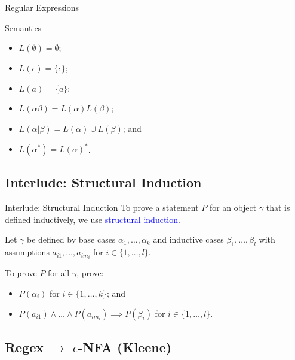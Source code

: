 \documentclass{beamer}
\def\padding{\vspace{0.5cm}}
\def\b{\textcolor{blue}}
\begin{document}
\begin{frame}{Regular Expressions}
    \begin{block}{Semantics}
        \begin{itemize}
            \item $L(\boldsymbol{\emptyset}) = \emptyset$\pause;
            \item $L(\epsilon) = \{\epsilon\}$\pause;
            \item $L(a) = \{a\}$\pause;
            \item $L(\alpha \beta) = L(\alpha) L(\beta)$\pause;
            \item $L(\alpha | \beta) = L(\alpha) \cup L(\beta)$\pause; and
            \item $L(\alpha^*) = L(\alpha)^*$.
        \end{itemize}
    \end{block}
\end{frame}

\subsection{Interlude: Structural Induction}

\begin{frame}{Interlude: Structural Induction}
    To prove a statement $P$ for an object $\gamma$ that is defined inductively, we use \b{structural induction}.\pause\padding

    Let $\gamma$ be defined by base cases $\alpha_1, \dots, \alpha_k$ and inductive cases $\beta_1, \dots, \beta_l$ with assumptions $a_{i1}, \dots, a_{im_i}$ for $i \in \{1, \dots, l\}$.\pause\padding

    To prove $P$ for all $\gamma$, prove:
    \begin{itemize}
        \item $P(\alpha_i)$ for $i \in \{1, \dots, k\}$\pause; and
        \item $P(a_{i1}) \land \dots \land P(a_{im_i}) \implies P(\beta_i)$ for $i \in \{1, \dots, l\}$.
    \end{itemize}
\end{frame}

\subsection{Regex $\to$ $\epsilon$-NFA (Kleene)}
\end{document}
